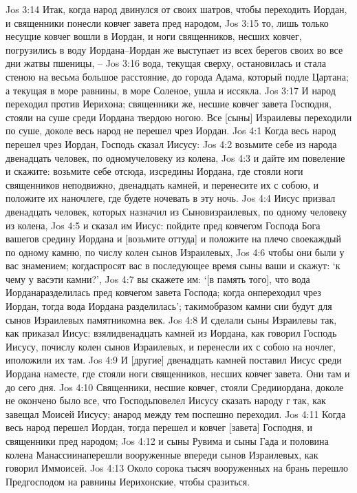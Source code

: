 Jos 3:14  Итак, когда народ двинулся от своих шатров, чтобы переходить Иордан, и священники понесли ковчег завета пред народом,
Jos 3:15  то, лишь только несущие ковчег вошли в Иордан, и ноги священников, несших ковчег, погрузились в воду Иордана--Иордан же выступает из всех берегов своих во все дни жатвы пшеницы, --
Jos 3:16  вода, текущая сверху, остановилась и стала стеною на весьма большое расстояние, до города Адама, который подле Цартана; а текущая в море равнины, в море Соленое, ушла и иссякла.
Jos 3:17  И народ переходил против Иерихона; священники же, несшие ковчег завета Господня, стояли на суше среди Иордана твердою ногою. Все [сыны] Израилевы переходили по суше, доколе весь народ не перешел чрез Иордан.
Jos 4:1  Когда весь народ перешел чрез Иордан, Господь сказал Иисусу:
Jos 4:2  возьмите себе из народа двенадцать человек, по одномучеловеку из колена,
Jos 4:3  и дайте им повеление и скажите: возьмите себе отсюда, изсредины Иордана, где стояли ноги священников неподвижно, двенадцать камней, и перенесите их с собою, и положите их наночлеге, где будете ночевать в эту ночь.
Jos 4:4  Иисус призвал двенадцать человек, которых назначил из Сыновизраилевых, по одному человеку из колена,
Jos 4:5  и сказал им Иисус: пойдите пред ковчегом Господа Бога вашегов средину Иордана и [возьмите оттуда] и положите на плечо своекаждый по одному камню, по числу колен сынов Израилевых,
Jos 4:6  чтобы они были у вас знамением; когдаспросят вас в последующее время сыны ваши и скажут: `к чему у васэти камни?',
Jos 4:7  вы скажете им: `[в память того], что вода Иорданаразделилась пред ковчегом завета Господа; когда онпереходил чрез Иордан, тогда вода Иордана разделилась'; такимобразом камни сии будут для сынов Израилевых памятникомна век.
Jos 4:8  И сделали сыны Израилевы так, как приказал Иисус: взялидвенадцать камней из Иордана, как говорил Господь Иисусу, почислу колен сынов Израилевых, и перенесли их с собою на ночлег, иположили их там.
Jos 4:9  И [другие] двенадцать камней поставил Иисус среди Иордана наместе, где стояли ноги священников, несших ковчег завета. Они там и до сего дня.
Jos 4:10  Священники, несшие ковчег, стояли Средииордана, доколе не окончено было все, что Господьповелел Иисусу сказать народу г так, как завещал Моисей Иисусу; анарод между тем поспешно переходил.
Jos 4:11  Когда весь народ перешел Иордан, тогда перешел и ковчег [завета] Господня, и священники пред народом;
Jos 4:12  и сыны Рувима и сыны Гада и половина колена Манассиинаперешли вооруженные впереди сынов Израилевых, как говорил Иммоисей.
Jos 4:13  Около сорока тысяч вооруженных на брань перешло Предгосподом на равнины Иерихонские, чтобы сразиться.
